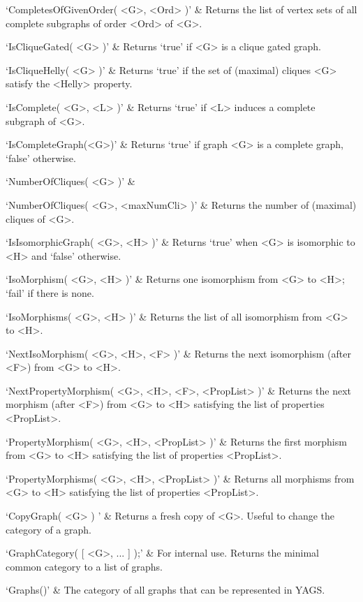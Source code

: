 `CompletesOfGivenOrder( <G>, <Ord> )' & 
Returns the list of vertex sets of all complete subgraphs of order <Ord> of <G>.

`IsCliqueGated( <G> )' & 
Returns `true' if <G> is a clique gated graph.

`IsCliqueHelly( <G> )' & 
Returns  `true'  if  the  set of (maximal) cliques <G> satisfy the <Helly> property.

`IsComplete( <G>, <L> )' & 
Returns `true' if <L> induces a complete subgraph of <G>.

`IsCompleteGraph(<G>)' & 
Returns  `true'  if graph <G> is a complete graph, `false' otherwise.

`NumberOfCliques( <G> )' & 

`NumberOfCliques( <G>, <maxNumCli> )' & 
Returns  the  number of (maximal) cliques of <G>.
\enditems


\beginitems
`IsIsomorphicGraph( <G>, <H> )' & 
Returns `true' when <G> is isomorphic to <H> and `false' otherwise.

`IsoMorphism( <G>, <H> )' & 
Returns one isomorphism from <G> to <H>; `fail' if there is none.

`IsoMorphisms( <G>, <H> )' & 
Returns  the  list  of  all  isomorphism  from  <G> to <H>.

`NextIsoMorphism( <G>, <H>, <F> )' & 
Returns the next isomorphism  (after <F>) from <G> to <H>.

`NextPropertyMorphism( <G>, <H>, <F>, <PropList> )' & 
Returns the next morphism (after <F>) from <G> to <H> satisfying  the  list  of  properties  <PropList>.

`PropertyMorphism( <G>, <H>, <PropList> )' & 
Returns  the  first  morphism from <G> to <H> satisfying the list of properties <PropList>.

`PropertyMorphisms( <G>, <H>, <PropList> )' & 
Returns all morphisms from <G> to <H> satisfying the list of properties <PropList>.
\enditems


\beginitems
`CopyGraph( <G> ) ' & 
Returns a fresh copy of <G>. Useful to change the category of a graph.

`GraphCategory( [ <G>, ... ] );' & 
For internal use. Returns the minimal common category to a list of graphs.

`Graphs()' & 
The category of all  graphs  that  can  be  represented in YAGS.

